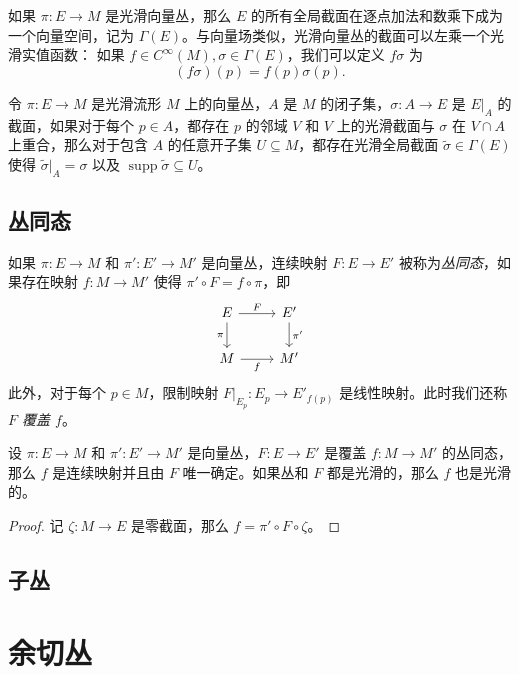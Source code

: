 \documentclass[fontset=none]{Notes}
\DeclareMathOperator\supp{supp}
\begin{document}
如果 $\pi:E\to M$ 是光滑向量丛，那么 $E$ 的所有全局截面在逐点加法和数乘下成为一个向量空间，记为
$\Gamma(E)$。与向量场类似，光滑向量丛的截面可以左乘一个光滑实值函数：
如果 $f\in C^\infty(M),\sigma\in\Gamma(E)$，我们可以定义 $f\sigma$ 为
\[
  (f\sigma)(p)=f(p)\sigma(p).
\] 

\begin{lemma}[向量丛的延拓引理]
  令 $\pi:E\to M$ 是光滑流形 $M$ 上的向量丛，$A$ 是 $M$ 的闭子集，$\sigma:A\to E$
  是 $E|_A$ 的截面，如果对于每个 $p\in A$，都存在 $p$ 的邻域 $V$ 和
  $V$ 上的光滑截面与 $\sigma$ 在 $V\cap A$ 上重合，那么对于包含 $A$ 的任意开子集
  $U\subseteq M$，都存在光滑全局截面 $\tilde\sigma\in \Gamma(E)$ 使得
  $\tilde{\sigma}|_A=\sigma$ 以及 $\supp\tilde{\sigma}\subseteq U$。
\end{lemma}


\section{丛同态}

如果 $\pi:E\to M$ 和 $\pi':E'\to M'$ 是向量丛，连续映射 $F:E\to E'$
被称为\emph{丛同态}，如果存在映射 $f:M\to M'$ 使得
$\pi'\circ F=f\circ\pi$，即
\[
  \begin{tikzcd}
    E\arrow[r,"F"]\arrow[d,"\pi"'] & E'\arrow[d,"\pi'"]\\
    M\arrow[r,"f"'] & M' 
  \end{tikzcd}  
\]
此外，对于每个 $p\in M$，限制映射 $F|_{E_p}:E_p\to E'_{f(p)}$
是线性映射。此时我们还称 \emph{$F$ 覆盖 $f$}。

\begin{proposition}
  设 $\pi:E\to M$ 和 $\pi':E'\to M'$ 是向量丛，$F:E\to E'$
  是覆盖 $f:M\to M'$ 的丛同态，那么 $f$ 是连续映射并且由 $F$
  唯一确定。如果丛和 $F$ 都是光滑的，那么 $f$ 也是光滑的。
\end{proposition}
\begin{proof}
  记 $\zeta:M\to E$ 是零截面，那么 $f=\pi'\circ F\circ\zeta$。
\end{proof}


\section{子丛}





\chapter{余切丛}
\end{document}
